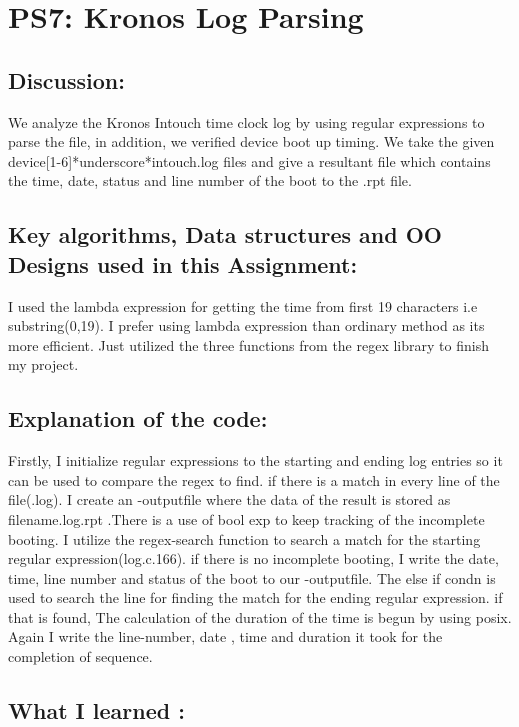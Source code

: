 \section{PS7: Kronos Log Parsing}\label{sec:ps7}
\graphicspath{{ps7}}
\subsection{Discussion:}\label{sec:ps7:disc}
    We analyze the Kronos Intouch time clock log by using regular expressions to parse the file, in addition,  we verified device boot up timing.
    We take the given device[1-6]*underscore*intouch.log files and give a resultant file which contains the time, date, status and line number of the boot to the .rpt file.

\subsection{Key algorithms, Data structures and OO Designs used in this Assignment:}
    I used the lambda expression for getting the time from first 19 characters i.e substring(0,19).
    I prefer using lambda expression than ordinary method as its more efficient.
    Just utilized the three functions from the regex library to finish my project.
\subsection{Explanation of the code:}
    Firstly, I initialize regular expressions to the starting and ending log entries so it can be used to compare the regex to find.
    if there is a match in every line of the file(.log). I create an -outputfile where the data of the result is stored as filename.log.rpt .There is a use of bool exp to keep tracking of the incomplete booting. I utilize the regex-search function to search a match for the starting regular expression(log.c.166). 
    if there is no incomplete booting, I write the date, time, line number and status of the boot to our -outputfile. The else if condn is used to search the line for finding the match for the ending regular expression. if that is found, The calculation of the duration of the time is begun by using posix. Again I write the line-number, date , time and duration it took for the completion of sequence.

\subsection{What I learned :}

